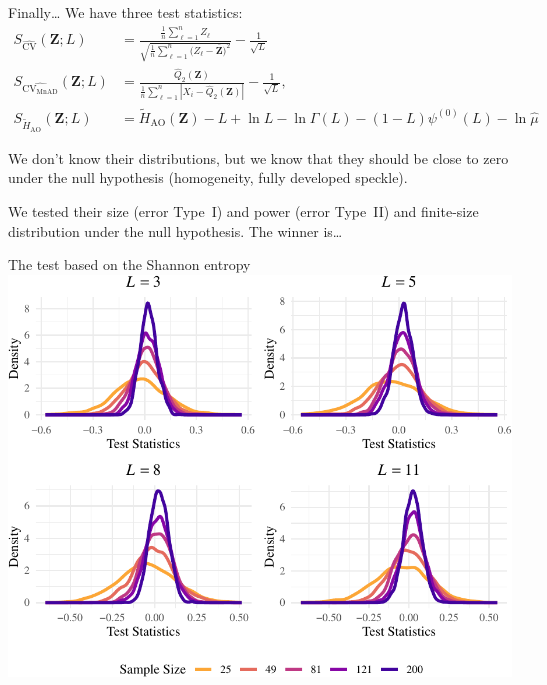 \documentclass[table,aspectratio=169]{beamer}
\begin{document}
\begin{frame}{Finally\dots}
	We have three test statistics:
	\begin{align*}
		S_{\widehat{\text{CV}}}(\bm Z;L) &= \frac{\frac1n \sum_{\ell=1}^n Z_\ell}{\sqrt{\frac1n \sum_{\ell=1}^n \big(Z_\ell-\overline{\bm Z}\big)^2}} - \frac1{\sqrt{L}} \\
		S_{\widehat{\text{CV}_{\text{MnAD}}}} (\bm Z;L) &= \frac{\widehat{Q}_2(\bm Z)}{\frac1n \sum_{\ell=1}^n|X_i-\widehat{Q}_2(\bm Z)|}-\frac1{\sqrt{L}},\\
		S_{\widetilde{H}_{\text{AO}}}(\bm{Z}; L) & = \widetilde{H}_{\text{AO}}(\bm Z) - L + \ln L - \ln\Gamma(L) - (1-L)\psi^{(0)}(L) - \ln \widehat{\mu}
	\end{align*}
	
We don't know their distributions, but we know that they should be close to zero under the null hypothesis (homogeneity, fully developed speckle).

We tested their size (error Type~I) and power (error Type~II) and finite-size distribution under the null hypothesis.
\alert{The winner is\dots}
\end{frame}

{
\begin{frame}{The test based on the Shannon entropy}
\centering
\includegraphics[width=0.7\linewidth]{R1-Identifying-Heterogeneity-in-SAR-Data-with-New-Test-Statistics_files/figure-latex/Plot_density-1}
\end{frame}
}
\end{document}
